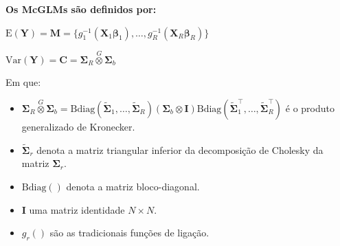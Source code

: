 \documentclass[10pt,
  aspectratio=169,
  serif,
  mathserif,
  professionalfont,
  compress,
  handout,
  ]{beamer}\usepackage[]{graphicx}\usepackage[]{color}
\begin{document}
\begin{frame}[c, allowframebreaks]

\textbf{Os McGLMs são definidos por:}

\begin{center}
$\mathrm{E}(\boldsymbol{Y}) = \boldsymbol{M} = \{g_1^{-1}(\boldsymbol{X}_1 \boldsymbol{\beta}_1), \ldots, g_R^{-1}(\boldsymbol{X}_R \boldsymbol{\beta}_R)\}$

$\mathrm{Var}(\boldsymbol{Y}) = \boldsymbol{C} = \boldsymbol{\Sigma}_R \overset{G} \otimes \boldsymbol{\Sigma}_b$

\end{center}
    
Em que: 

\begin{itemize}
  
  \item $\boldsymbol{\Sigma}_R \overset{G} \otimes \boldsymbol{\Sigma}_b = \mathrm{Bdiag}(\tilde{\boldsymbol{\Sigma}}_1, \ldots, \tilde{\boldsymbol{\Sigma}}_R) (\boldsymbol{\Sigma}_b \otimes \boldsymbol{I}) \mathrm{Bdiag}(\tilde{\boldsymbol{\Sigma}}_1^\top, \ldots, \tilde{\boldsymbol{\Sigma}}_R^\top)$ é o produto generalizado de Kronecker.
  
  \item $\tilde{\boldsymbol{\Sigma}}_r$ denota a matriz triangular inferior da decomposição de Cholesky da matriz ${\boldsymbol{\Sigma}}_r$.
  
  \item $\mathrm{Bdiag()}$ denota a matriz bloco-diagonal.
  
  \item $\boldsymbol{I}$ uma matriz identidade $N \times N$.
  
  \item $g_r()$ são as tradicionais funções de ligação.
  
\end{itemize}

\end{frame}

\end{document}
